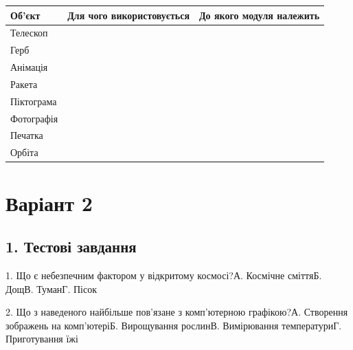 \documentclass[11pt,a4paper]{article}
\begin{document}
\begin{tabularx}{\linewidth}{|>{\raggedright\arraybackslash}X|>{\raggedright\arraybackslash}X|>{\raggedright\arraybackslash}X|}\hline

\textbf{Об'єкт} & \textbf{Для чого використовується} & \textbf{До якого модуля належить} \\ \hline

Телескоп &  &  \\ \hline

Герб &  &  \\ \hline

Анімація &  &  \\ \hline

Ракета &  &  \\ \hline

Піктограма &  &  \\ \hline

Фотографія &  &  \\ \hline

Печатка &  &  \\ \hline

Орбіта &  &  \\ \hline

\end{tabularx}\par

\newpage

\section*{Варіант 2}

\subsection*{1. Тестові завдання}

1. Що є небезпечним фактором у відкритому космосі?\newline А. Космічне сміття\newline Б. Дощ\newline В. Туман\newline Г. Пісок\par

2. Що з наведеного найбільше пов'язане з комп'ютерною графікою?\newline А. Створення зображень на комп'ютері\newline Б. Вирощування рослин\newline В. Вимірювання температури\newline Г. Приготування їжі\par
\end{document}
